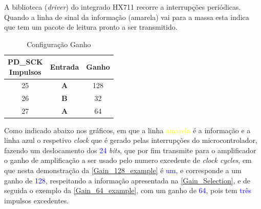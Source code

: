 A biblioteca (\textit{driver}) do integrado HX711 recorre a interrupções periódicas. Quando a linha de sinal da informação (amarela) vai para a massa esta indica que tem um pacote de leitura pronto a ser transmitido.
\emptyline
\begin{minipage}[!b]{\linewidth}
\begin{minipage}[!b]{.45\linewidth}
	\begin{table}[H]
		\captionsetup{justification=raggedright,singlelinecheck=false}
		\caption{Configuração Ganho}
		\begin{tabular}{ | c | c | c |  }
			\hline
			\makecell[c]{PD\_SCK \\ Impulsos} & Entrada  & Ganho \\
			\hline
			\hline
			25 & \textbf{A} & 128 \\
			\hline
			26 & \textbf{B} & 32 \\
			\hline
			27 & \textbf{A} & 64 \\
			\hline
		\end{tabular}
		\label{Gain_Selection}
	\end{table}
\end{minipage}
\begin{minipage}[l]{.53\linewidth}
\vspace{.1cm}
Como indicado abaixo nos gráficos, em que a linha \textcolor{yellow}{amarela} é a informação e a linha \textcolor{BlueGreen}{azul} o respetivo \textit{clock} que é gerado pelas interrupções do microcontrolador, fazendo um deslocamento dos \textcolor{blue}{24} \textit{bits}, que por fim transmite para o amplificador o ganho de amplificação a ser usado pelo numero excedente de \textit{clock cycles}, em que nesta demonstração da \autoref{Gain_128_example} é \textcolor{blue}{um}, e corresponde a um ganho de \textcolor{blue}{128}, respeitando a informação apresentada na \autoref{Gain_Selection},  e de seguida o exemplo da \autoref{Gain_64_example}, com um ganho de \textcolor{blue}{64}, pois tem \textcolor{blue}{três} impulsos excedentes.
\end{minipage}
\end{minipage}
\emptyline
